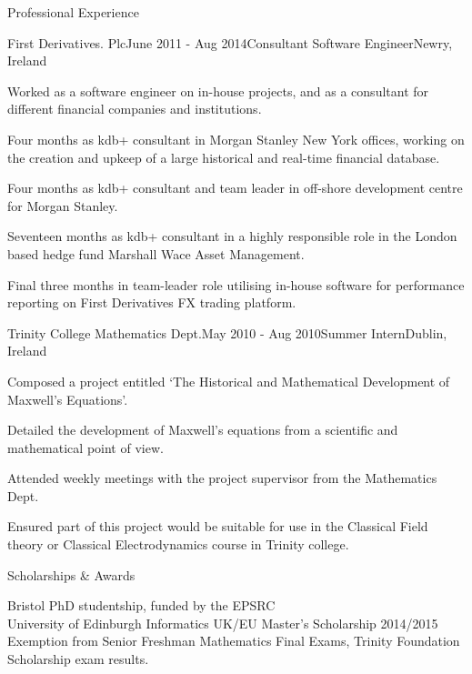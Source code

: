 \documentclass{resume} %
\begin{document}
\begin{rSection}{Professional Experience}
  \begin{rSubsection}{First Derivatives. Plc}{June 2011 - Aug 2014}{Consultant Software Engineer}{Newry, Ireland}
    \item Worked as a software engineer on in-house projects, and as a consultant for different financial companies and institutions.
    \item Four months as kdb+ consultant in Morgan Stanley New York offices, working on the creation and upkeep of a large historical and real-time financial database.
    \item Four months as kdb+ consultant and team leader in off-shore development centre for Morgan Stanley.
    \item Seventeen months as kdb+ consultant in a highly responsible role in the London based hedge fund Marshall Wace Asset Management.
    \item Final three months in team-leader role utilising in-house software for performance reporting on First Derivatives FX trading platform.
  \end{rSubsection}


\begin{rSubsection}{Trinity College Mathematics Dept.}{May 2010 - Aug 2010}{Summer Intern}{Dublin, Ireland}
\item Composed a project entitled `The Historical and Mathematical Development of Maxwell's Equations'.
\item Detailed the development of Maxwell's equations from a scientific and mathematical point of view.
\item Attended weekly meetings with the project supervisor from the Mathematics Dept.
\item Ensured part of this project would be suitable for use in the Classical Field theory or Classical Electrodynamics course in Trinity college.

\end{rSubsection}

\newpage


\begin{rSection}{Scholarships \& Awards}

Bristol PhD studentship, funded by the EPSRC \\
University of Edinburgh Informatics UK/EU Master's Scholarship 2014/2015 \\
Exemption from Senior Freshman Mathematics Final Exams, Trinity Foundation Scholarship exam results.


\end{rSection}
\end{rSection}
\end{document}
